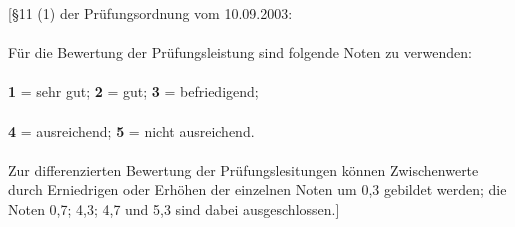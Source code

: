 [\S11 (1) der Pr\"ufungsordnung vom 10.09.2003: \\\\
F\"ur die Bewertung der Pr\"ufungsleistung sind folgende Noten zu verwenden:\\\\
\hspace*{3cm} {\bf 1} = sehr gut; \hspace*{2cm} {\bf 2} = gut; \hspace*{2cm}
{\bf 3} = befriedigend; \\\\
\hspace*{3cm} {\bf 4} = ausreichend; \hspace*{1.4cm} {\bf 5} =
nicht ausreichend. \\\\
Zur differenzierten Bewertung der Pr\"ufungslesitungen k\"onnen Zwischenwerte
durch Erniedrigen oder Erh\"ohen der einzelnen Noten um 0,3 gebildet werden;
die Noten 0,7; 4,3; 4,7 und 5,3 sind dabei ausgeschlossen.]
